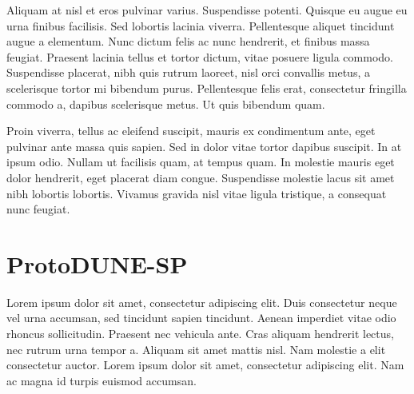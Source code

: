 Aliquam at nisl et eros pulvinar varius. Suspendisse potenti. Quisque eu augue eu urna finibus facilisis. Sed lobortis lacinia viverra. Pellentesque aliquet tincidunt augue a elementum. Nunc dictum felis ac nunc hendrerit, et finibus massa feugiat. Praesent lacinia tellus et tortor dictum, vitae posuere ligula commodo. Suspendisse placerat, nibh quis rutrum laoreet, nisl orci convallis metus, a scelerisque tortor mi bibendum purus. Pellentesque felis erat, consectetur fringilla commodo a, dapibus scelerisque metus. Ut quis bibendum quam.

Proin viverra, tellus ac eleifend suscipit, mauris ex condimentum ante, eget pulvinar ante massa quis sapien. Sed in dolor vitae tortor dapibus suscipit. In at ipsum odio. Nullam ut facilisis quam, at tempus quam. In molestie mauris eget dolor hendrerit, eget placerat diam congue. Suspendisse molestie lacus sit amet nibh lobortis lobortis. Vivamus gravida nisl vitae ligula tristique, a consequat nunc feugiat.



\section{ProtoDUNE-SP}
\label{sec:1}
Lorem ipsum dolor sit amet, consectetur adipiscing elit. Duis consectetur neque vel urna accumsan, sed tincidunt sapien tincidunt. Aenean imperdiet vitae odio rhoncus sollicitudin. Praesent nec vehicula ante. Cras aliquam hendrerit lectus, nec rutrum urna tempor a. Aliquam sit amet mattis nisl. Nam molestie a elit consectetur auctor. Lorem ipsum dolor sit amet, consectetur adipiscing elit. Nam ac magna id turpis euismod accumsan.

